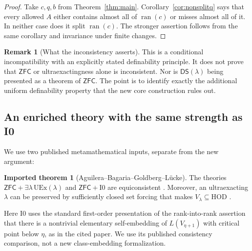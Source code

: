 \documentclass[11pt,letterpaper]{article}
\theoremstyle{definition}
\newtheorem{remark}[definition]{Remark}
\newtheorem{inputthm}[definition]{Imported theorem}
\newcommand{\ZFC}{\mathsf{ZFC}}
\newcommand{\HOD}{\mathrm{HOD}}
\newcommand{\UEx}{\mathrm{UEx}}
\newcommand{\ran}{\operatorname{ran}}
\newcommand{\Izero}{\mathrm I0}
\begin{document}
\begin{proof}
Take $c,q,b$ from Theorem~\ref{thm:main}. Corollary~\ref{cor:nonsplitq} says that every allowed $A$ either contains almost all of $\ran(c)$ or misses almost all of it. In neither case does it split $\ran(c)$. The stronger assertion follows from the same corollary and invariance under finite changes.
\end{proof}

\begin{remark}[What the inconsistency asserts]
This is a conditional incompatibility with an explicitly stated definability principle. It does not prove that $\ZFC$ or ultraexactingness alone is inconsistent. Nor is $\mathsf{DS}(\lambda)$ being presented as a theorem of $\ZFC$. The point is to identify exactly the additional uniform definability property that the new core construction rules out.
\end{remark}

\subsection{An enriched theory with the same strength as I0}

We use two published metamathematical inputs, separate from the new argument:
\begin{inputthm}[Aguilera--Bagaria--Goldberg--L\"ucke]\label{input:abgl}
The theories $\ZFC+\exists\lambda\,\UEx(\lambda)$ and $\ZFC+\Izero$ are equiconsistent \cite[Theorem~A/4.5]{abgl}. Moreover, an ultraexacting $\lambda$ can be preserved by sufficiently closed set forcing that makes $V_\lambda\subseteq\HOD$ \cite[Proposition~3.9]{abgl}.
\end{inputthm}

Here $\Izero$ uses the standard first-order presentation of the rank-into-rank assertion that there is a nontrivial elementary self-embedding of $L(V_{\eta+1})$ with critical point below $\eta$, as in the cited paper. We use its published consistency comparison, not a new class-embedding formalization.
\end{document}
